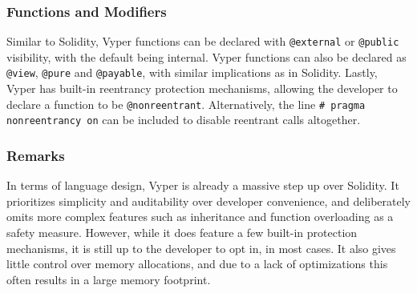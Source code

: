\subsubsection{Functions and Modifiers}
Similar to Solidity, Vyper functions can be declared with \lstinline{@external} or \lstinline{@public} visibility, with the default being internal. Vyper functions can also be declared as \lstinline{@view}, \lstinline{@pure} and \lstinline{@payable}, with similar implications as in Solidity. Lastly, Vyper has built-in reentrancy protection mechanisms, allowing the developer to declare a function to be \lstinline{@nonreentrant}. Alternatively, the line \lstinline{# pragma nonreentrancy on} can be included to disable reentrant calls altogether.

\subsubsection{Remarks}
In terms of language design, Vyper is already a massive step up over Solidity. It prioritizes simplicity and auditability over developer convenience, and deliberately omits more complex features such as inheritance and function overloading as a safety measure. However, while it does feature a few built-in protection mechanisms, it is still up to the developer to opt in, in most cases. It also gives little control over memory allocations, and due to a lack of optimizations this often results in a large memory footprint.


